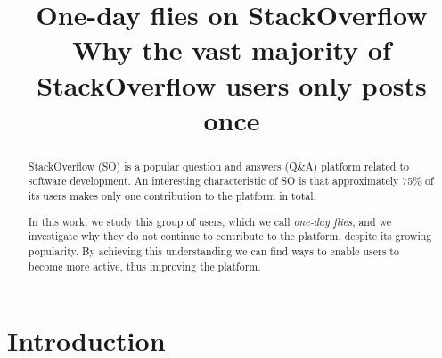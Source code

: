 \documentclass[conference]{IEEEtran}
\begin{document}
\title{One-day flies on StackOverflow\\
{\LARGE Why the vast majority of StackOverflow users only posts once}}


\author{
\and
{}
}

\author{
}





\maketitle


\begin{abstract}


StackOverflow (SO) is a popular question and answers (Q\&A) platform related to
software development. An interesting characteristic of SO is that approximately
75\% of its users makes only one contribution to the platform in total.

In this work, we study this group of users, which we call \emph{one-day
flies}, and we investigate why they do not continue to contribute to the
platform, despite its growing popularity. By achieving this understanding we 
can find ways to enable users to become more active, thus improving the 
platform. 
\end{abstract}

\IEEEpeerreviewmaketitle



\section{Introduction}
\end{document}
